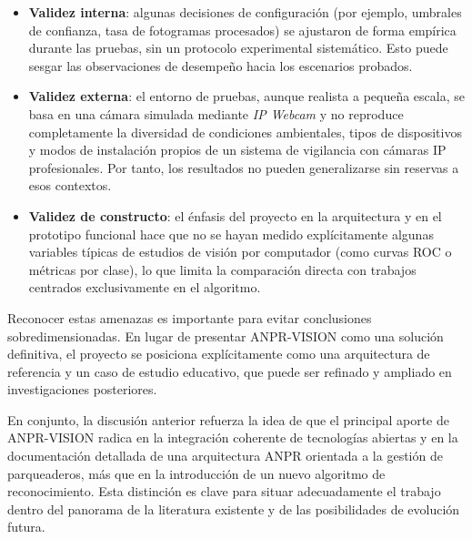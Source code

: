 \begin{itemize}
    \item \textbf{Validez interna}: algunas decisiones de configuración (por ejemplo, umbrales de confianza, tasa de fotogramas procesados) se ajustaron de forma empírica durante las pruebas, sin un protocolo experimental sistemático. Esto puede sesgar las observaciones de desempeño hacia los escenarios probados.
    \item \textbf{Validez externa}: el entorno de pruebas, aunque realista a pequeña escala, se basa en una cámara simulada mediante \textit{IP Webcam} y no reproduce completamente la diversidad de condiciones ambientales, tipos de dispositivos y modos de instalación propios de un sistema de vigilancia con cámaras IP profesionales. Por tanto, los resultados no pueden generalizarse sin reservas a esos contextos.
    \item \textbf{Validez de constructo}: el énfasis del proyecto en la arquitectura y en el prototipo funcional hace que no se hayan medido explícitamente algunas variables típicas de estudios de visión por computador (como curvas ROC o métricas por clase), lo que limita la comparación directa con trabajos centrados exclusivamente en el algoritmo.
\end{itemize}

Reconocer estas amenazas es importante para evitar conclusiones sobredimensionadas. En lugar de presentar ANPR-VISION como una solución definitiva, el proyecto se posiciona explícitamente como una arquitectura de referencia y un caso de estudio educativo, que puede ser refinado y ampliado en investigaciones posteriores.

En conjunto, la discusión anterior refuerza la idea de que el principal aporte de ANPR-VISION radica en la integración coherente de tecnologías abiertas y en la documentación detallada de una arquitectura ANPR orientada a la gestión de parqueaderos, más que en la introducción de un nuevo algoritmo de reconocimiento. Esta distinción es clave para situar adecuadamente el trabajo dentro del panorama de la literatura existente y de las posibilidades de evolución futura.
